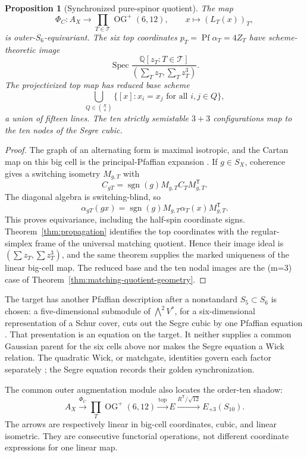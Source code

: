 \documentclass[11pt]{article}
\newtheorem{proposition}[theorem]{Proposition}
\theoremstyle{definition}
\theoremstyle{remark}
\newcommand{\cT}{\mathcal T}
\newcommand{\Pf}{\operatorname{Pf}}
\begin{document}
\begin{proposition}[Synchronized pure-spinor quotient]
\label{prop:synchronized-spinors}
The map
\[
 \Phi_C:A_X\longrightarrow
 \prod_{T\in\cT}\operatorname{OG}^+(6,12),
 \qquad x\longmapsto(L_T(x))_T,
\]
is outer-\(S_6\)-equivariant.  The six top coordinates
\(p_T=\Pf\alpha_T=4Z_T\) have scheme-theoretic image
\[
 \operatorname{Spec}\frac{\mathbb Q[z_T:T\in\cT]}
 {(\sum_Tz_T,\sum_Tz_T^3)}.
\]
The projectivized top map has reduced base scheme
\[
 \bigcup_{Q\in\binom X4}
 \{[x]:x_i=x_j\text{ for all }i,j\in Q\},
\]
a union of fifteen lines.  The ten strictly semistable \(3+3\)
configurations map to the ten nodes of the Segre cubic.
\end{proposition}

\begin{proof}
The graph of an alternating form is maximal isotropic, and the Cartan map
on this big cell is the principal-Pfaffian expansion
\cite{ChiriviMaffei}.  If \(g\in S_X\), coherence gives a switching
isometry \(M_{g,T}\) with
\[
 C_{gT}=\operatorname{sgn}(g)M_{g,T}C_TM_{g,T}^{\mathsf T}.
\]
The diagonal algebra is switching-blind, so
\[
 \alpha_{gT}(gx)=\operatorname{sgn}(g)
 M_{g,T}\alpha_T(x)M_{g,T}^{\mathsf T}.
\]
This proves equivariance, including the half-spin coordinate signs.
Theorem~\ref{thm:propagation} identifies the top coordinates with the
regular-simplex frame of the universal matching quotient.  Hence their
image ideal is \((\sum z_T,\sum z_T^3)\), and the same theorem supplies
the marked uniqueness of the linear big-cell map.  The reduced base and
the ten nodal images are the (m=3) case of
Theorem~\ref{thm:matching-quotient-geometry}.
\end{proof}

The target has another Pfaffian description after a nonstandard
\(S_5\subset S_6\) is chosen: a five-dimensional submodule of
\(\bigwedge^2V^*\), for a six-dimensional representation of a Schur cover,
cuts out the Segre cubic by one Pfaffian equation
\cite{TschinkelZhang}.  That presentation is an equation on the target.
It neither supplies a common Gaussian parent for the six cells above nor
makes the Segre equation a Wick relation.  The quadratic Wick, or
matchgate, identities govern each factor separately
\cite{ChiriviMaffei,CaiGorenstein}; the Segre equation records their golden
synchronization.

The common outer augmentation module also locates the order-ten shadow:
\[
 A_X\xrightarrow{\Phi_C}\prod_T\operatorname{OG}^+(6,12)
 \xrightarrow{\mathrm{top}}E
 \xrightarrow{R^{\mathsf T}/\sqrt{12}}E_{+3}(S_{10}).
\]
The arrows are respectively linear in big-cell coordinates, cubic, and
linear isometric.  They are consecutive functorial operations, not
different coordinate expressions for one linear map.
\end{document}
